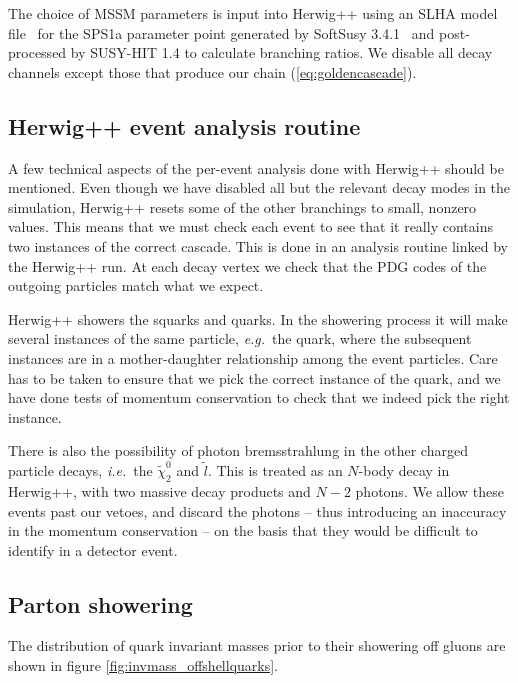 \documentclass[twoside,english]{uiofysmaster}
\begin{document}
The choice of MSSM parameters is input into {\ttfamily Herwig++} using an SLHA model file~\cite{Skands:2003cj} for the SPS1a parameter point
generated by {\ttfamily SoftSusy 3.4.1}~\cite{Allanach:2001kg} and post-processed by {\ttfamily SUSY-HIT 1.4} \cite{Djouadi:2006bz} to calculate branching ratios. We disable all decay channels except those that produce our chain (\ref{eq:goldencascade}). 

\subsection{Herwig++ event analysis routine} 

A few technical aspects of the per-event analysis done with {\ttfamily Herwig++} should be mentioned. Even though we have disabled all but the relevant decay modes in the simulation, {\ttfamily Herwig++} resets some of the other branchings to small, nonzero values. This means that we must check each event to see that it really contains two instances of the correct cascade. This is done in an analysis routine linked by the {\ttfamily Herwig++} run. At each decay vertex we check that the PDG codes of the outgoing particles match what we expect.

{\ttfamily Herwig++} showers the squarks and quarks. In the showering process it will make several instances of the same particle, {\it e.g.}\ the quark, where the subsequent instances are in a mother-daughter relationship among the event particles. Care has to be taken to ensure that we pick the correct instance of the quark, and we have done tests of momentum conservation to check that we indeed pick the right instance.

There is also the possibility of photon bremsstrahlung in the other charged particle decays, {\it i.e.}\ the $\tilde \chi_2^0$ and $\tilde l$. This is treated as an $N$-body decay in {\ttfamily Herwig++}, with two massive decay products and $N-2$ photons. We allow these events past our vetoes, and discard the photons -- thus introducing an inaccuracy in the momentum conservation -- on the basis that they would be difficult to identify in a detector event. 


\subsection{Parton showering}
The distribution of quark invariant masses prior to their showering off gluons are shown in figure \ref{fig:invmass_offshellquarks}.
\end{document}
